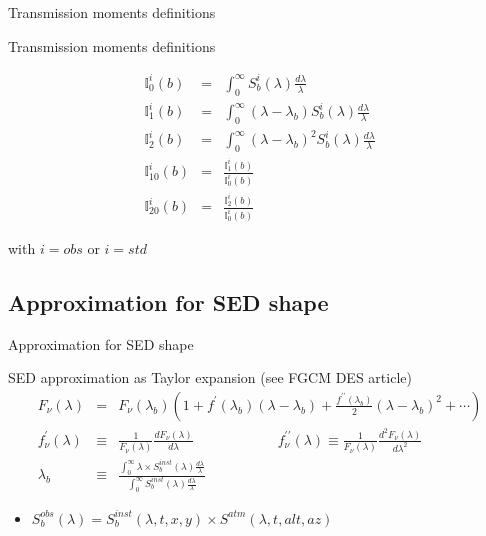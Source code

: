 \documentclass{beamer}
\begin{document}
\begin{frame}{Transmission moments definitions}
\begin{block}{Transmission moments definitions}

\begin{eqnarray}
\mathbb{I}_0^i(b) & = & \int_0^{\infty} S_b^i(\lambda) \frac{d\lambda}{\lambda} \\
\mathbb{I}_1^i(b) & = & \int_0^{\infty} (\lambda-\lambda_b) S_b^i(\lambda) \frac{d\lambda}{\lambda} \\
 \mathbb{I}_2^i(b) & = &\int_0^{\infty} (\lambda-\lambda_b)^2 S_b^i(\lambda) \frac{d\lambda}{\lambda} \\
\mathbb{I}^i_{10}(b)  & = &\frac{\mathbb{I}^i_1(b)}{\mathbb{I}^i_0(b)} \\
\mathbb{I}^i_{20}(b) & = & \frac{\mathbb{I}^i_2(b)}{\mathbb{I}^i_0(b)} 
\end{eqnarray}

with $i=obs$ or $i=std$
\end{block}
\end{frame}






\subsection{Approximation for SED shape}
\begin{frame}{Approximation for SED shape} 
\begin{exampleblock}{SED approximation as Taylor expansion (see FGCM DES article)}
\begin{eqnarray}
F_\nu(\lambda) & = & F_\nu(\lambda_b) \left(1 + f^\prime(\lambda_b)(\lambda-\lambda_b) + \frac{f^{\prime\prime}(\lambda_b)}{2}(\lambda-\lambda_b)^2 + \cdots \right) \\
f_\nu^\prime(\lambda) & \equiv & \frac{1}{F_\nu(\lambda)}\frac{dF_\nu(\lambda)}{d\lambda} \qquad \qquad \qquad
f_\nu^{\prime\prime}(\lambda)  \equiv  \frac{1}{F_\nu(\lambda)}\frac{d^2F_\nu(\lambda)}{d\lambda^2} \nonumber \\
\lambda_b & \equiv & \frac{\int_0^{\infty} \lambda \times S_b^{inst}(\lambda) \frac{d\lambda}{\lambda}}
{\int_0^{\infty} S_b^{inst}(\lambda) \frac{d\lambda}{\lambda}}
\end{eqnarray}

\begin{itemize}
\item $S_b^{obs}(\lambda) = S_b^{inst}(\lambda,t,x,y) \times S^{atm}(\lambda,t,alt,az)$
\end{itemize}
\end{exampleblock}
\end{frame}
\end{document}
